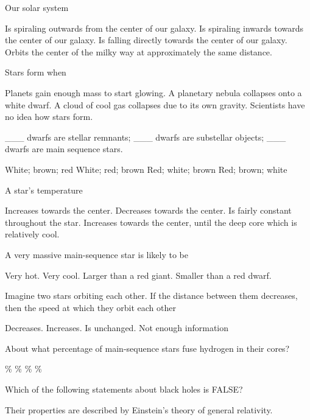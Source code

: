 \documentclass{exam}
\begin{document}
\begin{multicols*}{2}
\begin{questions}
	\question Our solar system
	\begin{choices}
		\choice Is spiraling outwards from the center of our galaxy.
		\choice Is spiraling inwards towards the center of our galaxy.
		\choice Is falling directly towards the center of our galaxy.
		\CorrectChoice Orbits the center of the milky way at approximately the same distance.
	\end{choices}
	\question Stars form when
	\begin{choices}
		\choice Planets gain enough mass to start glowing.
		\choice A planetary nebula collapses onto a white dwarf.
		\CorrectChoice A cloud of cool gas collapses due to its own gravity.
		\choice Scientists have no idea how stars form.
	\end{choices}
	\question \_\_\_ dwarfs are stellar remnants; \_\_\_ dwarfs are substellar objects; \_\_\_ dwarfs are main sequence stars.
	\begin{choices}
		\CorrectChoice White; brown; red
		\choice White; red; brown
		\choice Red; white; brown
		\choice Red; brown; white
	\end{choices}
	\question A star’s temperature
	\begin{choices}
		\CorrectChoice Increases towards the center.
		\choice Decreases towards the center.
		\choice Is fairly constant throughout the star.
		\choice Increases towards the center, until the deep core which is relatively cool.
	\end{choices}
	\question A very massive main-sequence star is likely to be
	\begin{choices}
		\CorrectChoice Very hot.
		\choice Very cool.
		\choice Larger than a red giant.
		\choice Smaller than a red dwarf.
	\end{choices}
	\vfill\null\columnbreak
	\question Imagine two stars orbiting each other. If the distance between them decreases, then the speed at which they orbit each other
	\begin{choices}
		\choice Decreases.
		\CorrectChoice Increases.
		\choice Is unchanged.
		\choice Not enough information
	\end{choices}
	\question About what percentage of main-sequence stars fuse hydrogen in their cores?
	\begin{choices}
		\choice 10\%
		\choice 40\%
		\choice 70\%
		\CorrectChoice 100\%
	\end{choices}
	\question Which of the following statements about black holes is FALSE?
	\begin{choices}
		\choice Their properties are described by Einstein’s theory of general relativity.

\end{choices}
\end{questions}
\end{multicols*}
\end{document}
